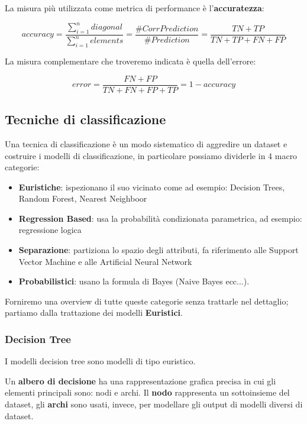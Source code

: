 \begin{defn}
	La misura più utilizzata come metrica di performance è l'\textbf{accuratezza}:
	
	\[accuracy = \frac{\sum_{i = 1}^{n} diagonal}{\sum_{i=1}^{n}elements} = \frac{\#CorrPrediction}{\#Prediction} = \frac{TN + TP}{TN + TP + FN + FP}\] 
	
	La misura complementare che troveremo indicata è quella dell'errore:
	
	\[error = \frac{FN + FP}{TN + FN + FP + TP} =  1 - accuracy\]
\end{defn}

\subsection{Tecniche di classificazione}

Una tecnica di classificazione è un modo sistematico di aggredire un dataset e costruire i modelli di classificazione, in particolare possiamo dividerle in 4 macro categorie:
\begin{itemize}
	\item \textbf{Euristiche}: ispezionano il suo vicinato come ad esempio: Decision Trees, Random Forest, Nearest Neighboor
	\item \textbf{Regression Based}: usa la probabilità condizionata parametrica, ad esempio: regressione logica
	\item \textbf{Separazione}: partiziona lo spazio degli attributi, fa riferimento alle Support Vector Machine e alle Artificial Neural Network
	\item \textbf{Probabilistici}: usano la formula di Bayes (Naive Bayes ecc...).
\end{itemize}

Forniremo una overview di tutte queste categorie senza trattarle nel dettaglio; partiamo dalla trattazione dei modelli \textbf{Euristici}.

\subsubsection{Decision Tree}
I modelli decision tree sono modelli di tipo euristico. 

Un \textbf{albero di decisione} ha una rappresentazione grafica precisa in cui gli elementi principali sono: nodi e archi. Il \textbf{nodo} rappresenta un sottoinsieme del dataset, gli \textbf{archi} sono usati, invece, per modellare gli output di modelli diversi di dataset.

